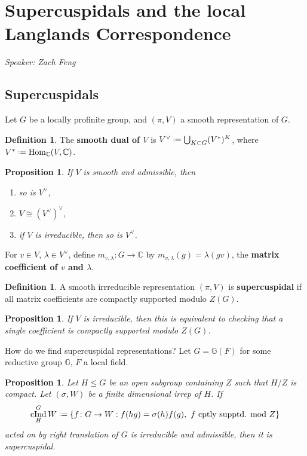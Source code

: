 \documentclass[11pt]{report}
\let\mbb\mathbb
\newcommand{\1}{\mathbbm 1}
\newcommand{\C}{\mathbb{C}}
\newcommand*{\defeq}{\mathrel{\vcenter{\baselineskip0.5ex \lineskiplimit0pt
      \hbox{\scriptsize.}\hbox{\scriptsize.}}}%
  =}
\DeclareMathOperator{\cInd}{cInd}
\DeclareMathOperator{\Hom}{Hom}
\theoremstyle{plain}
\newcounter{ex}
\newtheorem{prop}[thm]{Proposition}
\theoremstyle{definition}
\newtheorem{mydef}[thm]{Definition}
\theoremstyle{remark}
\numberwithin{equation}{section}
\begin{document}

\section{Supercuspidals and the local Langlands Correspondence}
\emph{Speaker: Zach Feng}
\subsection{Supercuspidals}
Let $G$ be a locally profinite group, and $(\pi,V)$ a smooth
representation of $G$.

\begin{mydef}
The \textbf{smooth dual of $V$} is  $V^{\vee} \defeq \bigcup_{K \subset G}(V^{*})^{K}$, where $V^{*} \defeq \Hom_{\C}(V,\C)$. 
\end{mydef}

\begin{prop}
  If $V$ is smooth and admissible, then
  \begin{enumerate}
  \item so is $V^{\vee}$,
    
  \item $V \cong (V^{\vee})^{\vee}$,
  \item if $V$ is irreducible, then so is $V^{\vee}$.
  \end{enumerate}
\end{prop}

For $v \in V$, $\lambda \in V^{\vee}$, define $m_{v,\lambda}\colon G \to \C$ by $m_{v,\lambda}(g) = \lambda(gv)$, the \textbf{matrix coefficient of $v$ and $\lambda$}. 

\begin{mydef}
  A smooth irrreducible representation $(\pi,V)$ is \textbf{supercuspidal} if all matrix coefficients are compactly supported modulo $Z(G)$. 
\end{mydef}

\begin{prop}
  If $V$ is irreducible, then this is equivalent to checking that a single coefficient is compactly supported modulo $Z(G)$.
\end{prop}

How do we find supercuspidal representations? Let $G = \mbb G(F)$ for some reductive group $\mbb G$, $F$ a local field.
\begin{prop}\label{prop:cind-sc}
  Let $H \le G$ be an open subgroup containing $Z$ such that $H/Z$ is compact. Let $(\sigma,W)$ be a finite dimensional irrep of $H$. If
  \begin{equation}
    \cInd_{H}^{G} W \defeq \{f \colon G \to W : f(hg) = \sigma(h)f(g),\
    f\text{ cptly supptd. mod $Z$}\}
\end{equation}
acted on by right translation of $G$ is irreducible and admissible,
then it is supercuspidal.
\end{prop}
\end{document}

